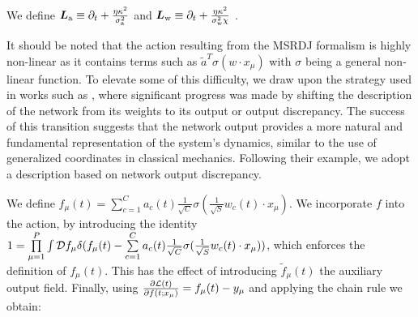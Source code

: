 We define $\bm{L}_{\rm a}\equiv\partial_t+\frac{\eta \kappa^2}{\sigma_{\rm a}^2}$ and $\bm{L}_{\rm w}\equiv\partial_t+\frac{\eta\kappa^2}{\sigma_{\rm w}^2\chi}$ .

It should be noted that the action resulting from the MSRDJ formalism is highly non-linear as it contains terms such as $\tilde{a}^T\sigma(w\cdot x_\mu)$ with $\sigma$ being a general non-linear function. To elevate some of this difficulty, we draw upon the strategy used in works such as  \cite{Jacot2018}, where significant progress was made by shifting the description of the network from its weights to its output or output discrepancy. The success of this transition suggests that the network output provides a more natural and fundamental representation of the system's dynamics, similar to the use of generalized coordinates in classical mechanics.
Following their example, we adopt a description based on network output discrepancy.

We define $f_\mu(t)=\sum\limits_{c=1}^{C}a_{c}(t) \frac{1}{\sqrt{C}}\sigma( \frac{1}{\sqrt{S}}w_c(t)\cdot x_{\mu})$. We incorporate $f$ into the action, by introducing the identity $1=\prod\limits_{\mu=1}^{P}\int \mathcal{D} f_\mu \delta(f_\mu(t)-\sum\limits_{c=1}^{C}a_{c}(t) \frac{1}{\sqrt{C}}\sigma( \frac{1}{\sqrt{S}}w_c(t)\cdot x_{\mu}))$, which enforces the definition of $f_\mu(t)$. This has the effect of introducing $\tilde f_\mu(t)$ the auxiliary output field. 
Finally, using $\frac{\partial \mathcal{L}(t)}{\partial f(t;x_\mu)}=f_\mu(t)-y_\mu$ and applying the chain rule we obtain:

